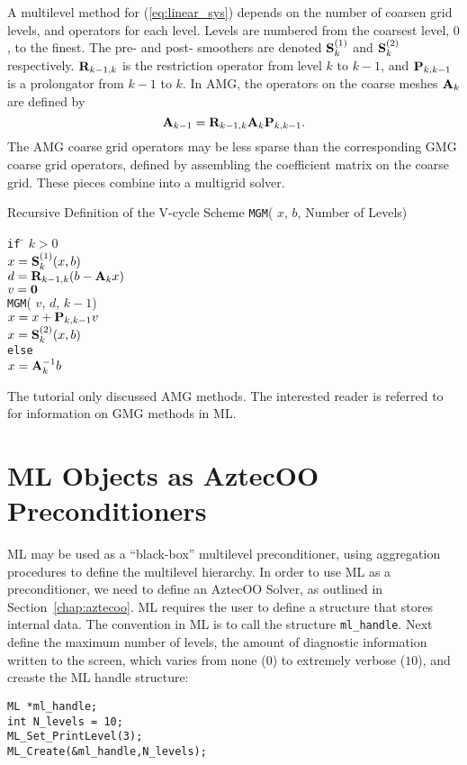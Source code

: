 A multilevel method for (\ref{eq:linear_sys}) 
depends on the number of coarsen grid levels, 
and operators for each level.
Levels are numbered from the coarsest level, $0$, to the finest.
The pre- and post- smoothers  are denoted
${\bf S}_k^{(1)}$ and ${\bf S}_k^{(2)}$ respectively.
${\bf R}_{k-1,k}$
is the restriction operator from level $k$ to $k-1$, and ${\bf P}_{k,k-1}$ is a
prolongator from $k-1$ to $k$.
In AMG, the operators on the coarse meshes ${\bf A}_k$ are defined by
\[
{\bf A}_{k-1} = {\bf R}_{k-1,k} {\bf A}_k {\bf P}_{k,k-1}.
\]
The AMG coarse grid operators may be less sparse than the corresponding GMG coarse grid operators,
defined by assembling the coefficient matrix on the coarse grid.
These pieces combine into a multigrid solver.
\begin{center}
  Recursive Definition of the V-cycle Scheme {\tt MGM}( $x$, $b$, Number
  of Levels)
\end{center}
\begin{tabbing}
{\tt if} \= $k>0$ \\
\> $x = {\bf S}_k^{(1)} (x, b)$ \\
\> $d = {\bf R}_{k-1,k}(b - {\bf A}_k x)$\\
\> $v = {\bf 0}$ \\
\> {\tt MGM}( $v$, $d$, $k-1$) \\
\> $x = x + {\bf P}_{k,k-1} v $\\
\> $x = {\bf S}_k^{(2)}( x, b )$\\
{\tt else} \\
\> $x = {\bf A}_k^{-1} b $\\
\end{tabbing}
\begin{remark}
The tutorial only discussed AMG methods.
The interested reader is referred to 
\cite{ML-home-page} for information on GMG methods
in ML.
\end{remark}
\section{ML Objects as AztecOO Preconditioners}
\label{sec:ml_prec}
ML may be used as a ``black-box'' multilevel preconditioner, 
using aggregation procedures to define the multilevel hierarchy. 
In order to use ML as a preconditioner, we need to define an
AztecOO Solver, as outlined in Section~\ref{chap:aztecoo}. 
ML requires the user to define a structure that stores internal data.
The convention in ML is to call the structure \verb!ml_handle!.
Next define the maximum number of levels, 
the amount of diagnostic information written to the screen, 
which varies from none ($0$) to extremely verbose ($10$), 
and creaste the ML handle structure:
\begin{verbatim}
ML *ml_handle;
int N_levels = 10;
ML_Set_PrintLevel(3);
ML_Create(&ml_handle,N_levels);
\end{verbatim}

